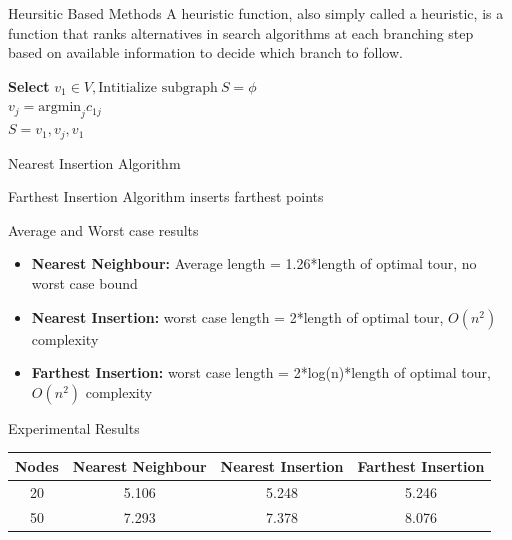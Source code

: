 \documentclass[9pt]{beamer}
\begin{document}
\begin{frame}{Heursitic Based Methods}
A heuristic function, also simply called a heuristic, is a function that ranks alternatives in search algorithms at each branching step based on available information to decide which branch to follow.
\begin{algorithm}[H]

\SetAlgoLined
\textbf{Select} $v_1\in V,\text{Intitialize subgraph}\ S= \phi$\\
 $v_j = \text{argmin}_j c_{1j}$ \\
$S= {v_1,v_j,v_1}$\\
 \EndFor
 \caption{Nearest Insertion Algorithm}

\end{algorithm}
Farthest Insertion Algorithm inserts farthest points
\end{frame}
\begin{frame}{Average and Worst case results}
\begin{itemize}
    \item \textbf{Nearest Neighbour:} Average length = 1.26*length of optimal tour, no worst case bound
    \vspace{20pt}
    \item \textbf{Nearest Insertion:} worst case length = 2*length of optimal tour, $O(n^2)$ complexity
    \vspace{20pt}
    \item \textbf{Farthest Insertion:} worst case length = 2*log(n)*length of optimal tour, $O(n^2)$ complexity
\end{itemize}
\end{frame}
\begin{frame}{Experimental Results}
\vspace{-60pt}
\begin{center}
\begin{tabular}{|c|c|c|c|}
\hline
    Nodes & Nearest Neighbour &  Nearest Insertion & Farthest Insertion\\\hline
    20 & 5.106 & 5.248 & 5.246\\\hline
    50 & 7.293  & 7.378 & 8.076\\\hline
\end{tabular}
\end{center}

\end{frame}
\end{document}
